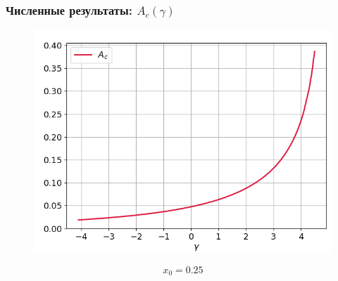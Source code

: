 \documentclass[fullscreen=true, unicode, bookmarks=false]{beamer}
\begin{document}
\begin{frame}
\frametitle{ Численные результаты: $ A_c(\gamma) $ }

\begin{figure} 
\includegraphics[scale=0.55]{oscillating_amplitude_14.png}  
\end{figure}

$$ x_0 = 0.25 $$

\end{frame}
\end{document}
